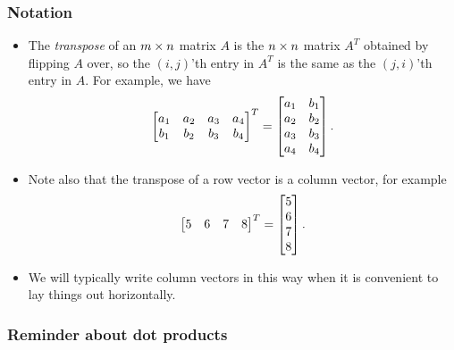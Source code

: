 \documentclass[9pt]{beamer}
\begin{document}
\begin{frame}
 \frametitle{Notation}
 \begin{itemize}
  \item<1-> The \emph{transpose} of an $m\times n$ matrix $A$ is the $n\times
   n$ matrix $A^T$ obtained by flipping $A$ over, so the $(i,j)$'th
   entry in $A^T$ is the same as the $(j,i)$'th entry in $A$.  For
   example, we have 
   \[ \left[\begin{matrix} a_1 & a_2 & a_3 & a_4 \\ b_1 & b_2 & b_3 & b_4 \end{matrix}\right]^T =
       \left[\begin{matrix} a_1 & b_1 \\ a_2 & b_2 \\ a_3 & b_3 \\ a_4 & b_4 \end{matrix}\right].
   \]
  \item<2-> Note also that the transpose of a row vector is a column
   vector, for example 
   \[ \left[\begin{matrix} 5 & 6 & 7 & 8 \end{matrix}\right]^T = \left[\begin{matrix} 5 \\ 6 \\ 7 \\ 8 \end{matrix}\right]. \]
  \item<3-> We will typically write column vectors in this way when it
   is convenient to lay things out horizontally.
 \end{itemize}
\end{frame}

\begin{frame}[t]
 \frametitle{Reminder about dot products}
 
\end{frame}
\end{document}
